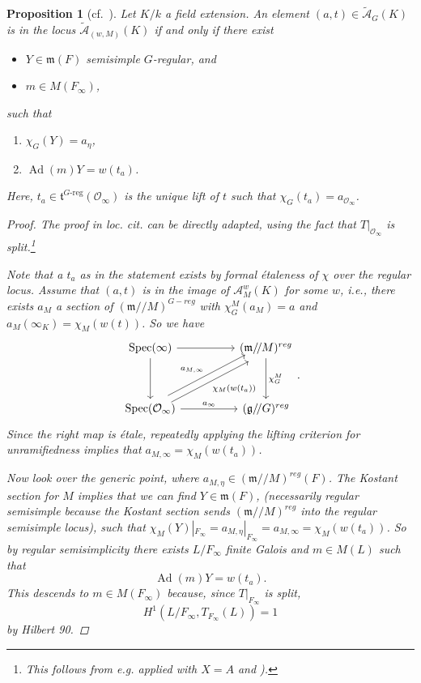 \documentclass[openany]{amsbook}
\newtheorem{proposition}[theorem]{Proposition}
\theoremstyle{definition}
\theoremstyle{remark}
\numberwithin{equation}{section}
\renewcommand{\O}{\mathcal{O}}
\newcommand{\cA}{\mathcal{A}}
\newcommand{\m}{\mathfrak{m}}
\renewcommand{\-}{\operatorname{-}}
\newcommand{\Spec}{\operatorname{Spec}}
\renewcommand{\m}{\mathfrak{m}}
\newcommand{\g}{\mathfrak{g}}
\newcommand{\on}[1]{\operatorname{#1}}
\newcommand{\fm}{\mathfrak{m}}
\newcommand{\ctA}{\widetilde{\cA}}
\newcommand{\ctAt}[2]{\ctA_{(#1,#2)}}
\newcommand{\ft}{\mathfrak{t}}
\renewcommand{\fm}{\mathfrak{m}}
\newcommand{\Greg}{G\text{-reg}}
\newcommand{\gitq}{/\!/}
\begin{document}
\begin{proposition}[{{{cf.\ \cite[Proposition 3.9.1]{CLI}}}}]\label{prop.CLI.3.8.twisted}
    Let $K/k$ a field extension. An element $(a,t) \in \ctA_G(K)$ is in the locus $\ctAt{w}{M}(K)$ if and only if there exist 
    \begin{itemize}
        \item $Y \in \fm(F)$ semisimple $G$-regular, and
        \item $m \in M(F_\infty)$, 
    \end{itemize}
    such that 
    \begin{enumerate}[label=(\alph*)]
        \item $\chi_G(Y) = a_\eta$,
        \item $\on{Ad}(m)Y = w(t_a)$.
    \end{enumerate}
    Here, $t_a \in \ft^{\Greg}(\O_\infty)$ is the unique lift of $t$ such that $\chi_G(t_a) = a_{\O_\infty}$.
    \begin{proof}
        The proof in \textit{loc. cit.} can be directly adapted, using the fact that $T|_{\O_\infty}$ is split.\footnote{This follows from e.g. \cite[Tag 0BQC]{stacks-project} applied with $X = A$ and \cite[B.3.6]{conradrgs}).}
        
        Note that a $t_a$ as in the statement exists by formal \'etaleness of $\chi$ over the regular locus. Assume that $(a,t)$ is in the image of $\cA_M^w(K)$ for some $w$, i.e., there exists $a_M$ a section of $(\m\gitq M)^{G-reg}$ with $\chi^M_G(a_M) = a$ and $a_M(\infty_K) = \chi_M(w(t))$. So we have 
\[
    \begin{tikzcd}[ampersand replacement=\&]
        \Spec(\infty) \ar[dd] \ar[rr] \& \& (\m\gitq M)^{reg} \ar[dd, "\chi^M_G"] \\
        \& \& \\
        \Spec(\O_{\infty})  \ar[rr, "a_\infty"] \ar[uurr, shift left=.75ex,"a_{M,\infty}" above left] \ar[urur, shift right=.75ex, "\chi_M(w(t_a))" below right] \& \& (\g\gitq G)^{reg}
    \end{tikzcd}.
\]
Since the right map is \'etale, repeatedly applying the lifting criterion for unramifiedness implies that $a_{M,\infty} = \chi_M(w(t_a))$. 

Now look over the generic point, where $a_{M, \eta} \in (\m\gitq M)^{reg}(F)$. The Kostant section for $M$ implies that we can find $Y \in \m(F)$, (necessarily regular semisimple because the Kostant section sends $(\m\gitq M)^{reg}$ into the regular semisimple locus), such that $\chi_M(Y)|_{F_\infty} = a_{M,\eta}|_{F_\infty} = a_{M, \infty} = \chi_M(w(t_a))$. So by regular semisimplicity there exists $L/F_{\infty}$ finite Galois and $m \in M(L)$ such that
\[
    \on{Ad}(m) Y = w(t_a).
\]
This descends to $m \in M(F_\infty)$ because, since $T|_{F_{\infty}}$ is split,
\[
    H^1(L/F_\infty, T_{F_\infty}(L)) = 1
\]
by Hilbert 90. 


\end{proof}
\end{proposition}
\end{document}

